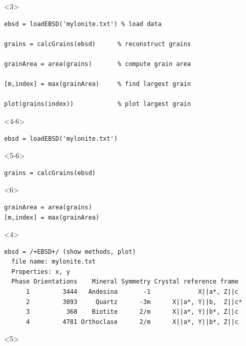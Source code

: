 \documentclass[comptress]{beamer}
\begin{document}
\begin{frame}[fragile]
\begin{overlayarea}{\textwidth}{5cm}
\begin{onlyenv}
    \end{onlyenv}

    \begin{onlyenv}<3>
\begin{lstlisting}[style=input]
ebsd = loadEBSD('mylonite.txt') % load data

grains = calcGrains(ebsd)      % reconstruct grains

grainArea = area(grains)       % compute grain area

[m,index] = max(grainArea)     % find largest grain

plot(grains(index))            % plot largest grain
\end{lstlisting}
    \end{onlyenv}

    \begin{onlyenv}<4-6>
      \begin{lstlisting}[style=input]
ebsd = loadEBSD('mylonite.txt')
      \end{lstlisting}
    \end{onlyenv}
    \begin{onlyenv}<5-6>
      \vspace{-0.4cm}
      \begin{lstlisting}[style=input]
grains = calcGrains(ebsd)
    \end{lstlisting}
    \end{onlyenv}
    \begin{onlyenv}<6>
      \vspace{-0.4cm}
      \begin{lstlisting}[style=input]
grainArea = area(grains)
[m,index] = max(grainArea)
    \end{lstlisting}
    \end{onlyenv}
\begin{onlyenv}<4>
\begin{lstlisting}[style=output]
ebsd = /+EBSD+/ (show methods, plot)
  file name: mylonite.txt
  Properties: x, y
  Phase Orientations    Mineral Symmetry Crystal reference frame
      1         3444   Andesina       -1             X||a*, Z||c
      2         3893     Quartz      -3m      X||a*, Y||b,  Z||c*
      3          368    Biotite      2/m      X||a*, Y||b*, Z||c
      4         4781 Orthoclase      2/m      X||a*, Y||b*, Z||c
  \end{lstlisting}
    \end{onlyenv}
\begin{onlyenv}<5>
\begin{lstlisting}[style=output]

\end{lstlisting}
\end{onlyenv}
\end{overlayarea}
\end{frame}
\end{document}
